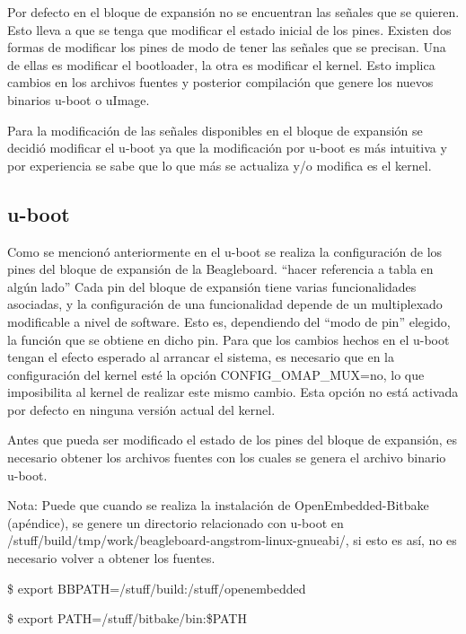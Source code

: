 \bigskip
Por defecto en el bloque de expansión no se encuentran las señales que se quieren. Esto 
lleva a que se tenga que modificar el estado inicial de los pines. 
Existen dos formas de modificar los pines de modo de tener las señales que se precisan. Una de ellas es modificar el bootloader, la otra es modificar el kernel. Esto implica cambios
en los archivos fuentes y posterior compilación que genere los nuevos binarios u-boot o uImage. 

\bigskip
Para la modificación de las señales disponibles en el bloque de expansión se decidió modificar el u-boot ya que la modificación por u-boot es más intuitiva y por experiencia se sabe que lo que más se actualiza y/o modifica es el kernel. 

\subsection{u-boot}
Como se mencionó anteriormente en el u-boot se realiza la configuración de los pines del bloque de expansión de la Beagleboard. “hacer referencia a tabla en algún lado”
Cada pin del bloque de expansión tiene varias funcionalidades asociadas, y la configuración de una 
funcionalidad depende de un multiplexado modificable a nivel de software. Esto es, dependiendo del “modo de pin” elegido, la función que se obtiene en dicho pin.
Para que los cambios hechos en el u-boot tengan el efecto esperado al arrancar el sistema, es necesario que en la configuración del kernel esté la opción CONFIG\_OMAP\_MUX=no, lo que imposibilita al kernel de realizar este mismo cambio. Esta opción no está activada por defecto en ninguna versión actual del kernel. 

\bigskip
Antes que pueda ser modificado el estado de los pines del bloque de expansión,
es necesario obtener los archivos fuentes con los cuales se genera el archivo binario u-boot.

\bigskip
Nota: Puede que cuando se realiza la instalación de OpenEmbedded-Bitbake (apéndice), se genere un directorio relacionado con u-boot en /stuff/build/tmp/work/beagleboard-angstrom-linux-gnueabi/, si esto es así, no es necesario volver a obtener los fuentes.

\bigskip
{}

\centerline{\$ export BBPATH=/stuff/build:/stuff/openembedded}

\centerline{\$ export PATH=/stuff/bitbake/bin:\$PATH}

\bigskip
{}

